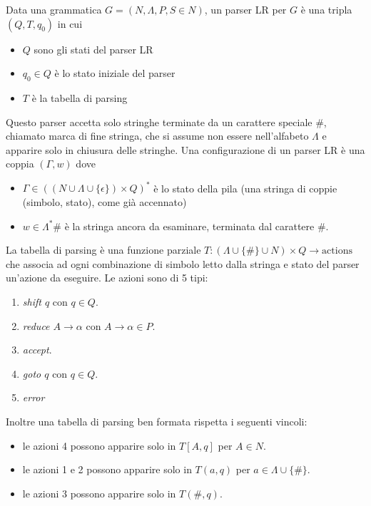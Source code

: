 \documentclass[12pt]{article}
\numberwithin{theorem}{subsection}
\begin{document}
Data una grammatica $G = (N, \Lambda, P, S \in N)$, un parser LR per $G$ è una tripla $(Q, T, q_0)$ in cui
\begin{itemize}
	\item $Q$ sono gli stati del parser LR
	\item $q_0 \in Q$ è lo stato iniziale del parser
	\item $T$ è la tabella di parsing
\end{itemize}
Questo parser accetta solo stringhe terminate da un carattere speciale \#, chiamato marca di fine stringa, che si assume non essere nell'alfabeto $\Lambda$ e apparire solo in chiusura delle stringhe. Una configurazione di un parser LR è una coppia $(\Gamma, w)$ dove
\begin{itemize}
	\item $\Gamma \in ((N \cup \Lambda \cup \{ \epsilon \}) \times Q)^*$ è lo stato della pila (una stringa di coppie (simbolo, stato), come già accennato)
	\item $w \in \Lambda^* \#$ è la stringa ancora da esaminare, terminata dal carattere \#.
\end{itemize}

La tabella di parsing è una funzione parziale $T: (\Lambda \cup \{ \# \} \cup N) \times Q \rightarrow \text{actions}$ che associa ad ogni combinazione di simbolo letto dalla stringa e stato del parser un'azione da eseguire. Le azioni sono di 5 tipi:
\begin{enumerate}
	\item \textit{shift $q$} con $q \in Q$.
	\item \textit{reduce $A \rightarrow \alpha$} con $A \rightarrow \alpha \in P$.
	\item \textit{accept}.
	\item \textit{goto $q$} con $q \in Q$.
	\item \textit{error}
\end{enumerate}

Inoltre una tabella di parsing ben formata rispetta i seguenti vincoli:
\begin{itemize}
	\item le azioni 4 possono apparire solo in $T[A, q]$ per $A \in N$.
	\item le azioni 1 e 2 possono apparire solo in $T(a, q)$ per $a \in \Lambda \cup \{ \# \}$.
	\item le azioni 3 possono apparire solo in $T(\#, q)$.
\end{itemize}
\end{document}

